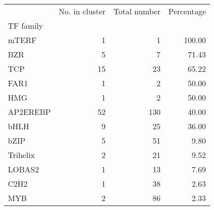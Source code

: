\begin{tabular}{lrrr}
\toprule
{} &  No. in cluster &  Total number &  Percentage \\
TF family &                 &               &             \\
\midrule
mTERF     &               1 &             1 &      100.00 \\
BZR       &               5 &             7 &       71.43 \\
TCP       &              15 &            23 &       65.22 \\
FAR1      &               1 &             2 &       50.00 \\
HMG       &               1 &             2 &       50.00 \\
AP2EREBP  &              52 &           130 &       40.00 \\
bHLH      &               9 &            25 &       36.00 \\
bZIP      &               5 &            51 &        9.80 \\
Trihelix  &               2 &            21 &        9.52 \\
LOBAS2    &               1 &            13 &        7.69 \\
C2H2      &               1 &            38 &        2.63 \\
MYB       &               2 &            86 &        2.33 \\
\bottomrule
\end{tabular}
